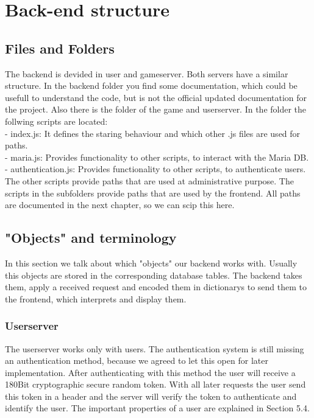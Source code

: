 \chapter{Back-end structure}
\section {Files and Folders}
The backend is devided in user and gameserver. Both servers have a similar structure.
In the backend folder you find some documentation, which could be usefull to understand the code, but is not the official updated documentation for the project.  Also there is the folder of the game and userserver. In the folder the follwing scripts are located:\\
- index.js: It defines the staring behaviour and which other .js files are used for paths.\\
- maria.js: Provides functionality to other scripts, to interact with the Maria DB.\\
- authentication.js: Provides functionality to other scripts, to authenticate users.\\
The other scripts provide paths that are used at administrative purpose. The scripts in the subfolders provide paths that are used by the frontend. All paths are documented in the next chapter, so we can scip this here.\\

\section {"Objects" and terminology}
In this section we talk about which "objects" our backend works with. Usually this objects are stored in the corresponding database tables. The backend takes them, apply a received request and encoded them in dictionarys to send them to the frontend, which interprets and display them.\\

\subsection{Userserver}
The userserver works only with users. 
The authentication system is still missing an authentication method, because we agreed to let this open for later implementation. After authenticating with this method the user will receive a 180Bit cryptographic secure random token. With all later requests the user send this token in a header and the server will verify the token to authenticate and identify the user. The important properties of a user are explained in Section 5.4.

